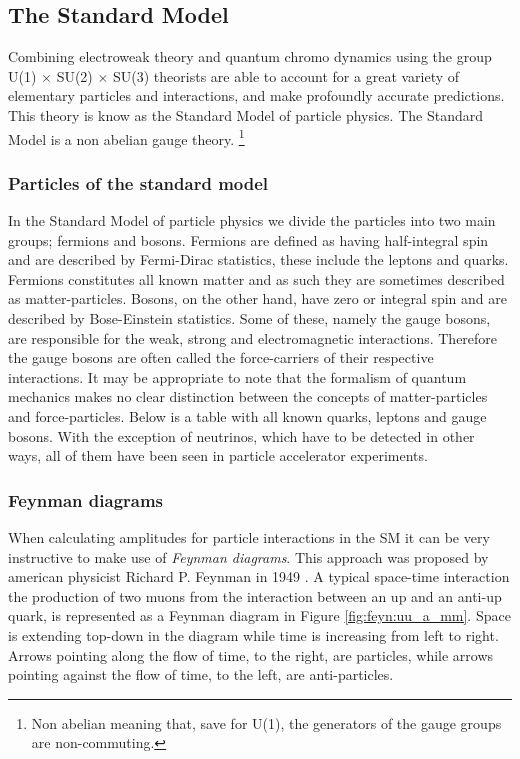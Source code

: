 \subsection{The Standard Model}
Combining electroweak theory and quantum chromo dynamics using the group U(1) $\times$ SU(2) $\times$ SU(3) theorists are able to account for a great variety of elementary particles and interactions, and make profoundly accurate predictions. This theory is know as the Standard Model of particle physics. The Standard Model is a non abelian gauge theory. \footnote{Non abelian meaning that, save for U(1), the generators of the gauge groups are non-commuting.}

\subsubsection{Particles of the standard model}


In the Standard Model of particle physics we divide the particles into two main groups; fermions and bosons. Fermions are defined as having half-integral spin and are described by Fermi-Dirac statistics, these include the leptons and quarks. Fermions constitutes all known matter and as such they are sometimes described as matter-particles. Bosons, on the other hand, have zero or integral spin and are described by Bose-Einstein statistics. Some of these, namely the gauge bosons, are responsible for the weak, strong and electromagnetic interactions. Therefore the gauge bosons are often called the force-carriers of their respective interactions. It may be appropriate to note that the formalism of quantum mechanics makes no clear distinction between the concepts of matter-particles and force-particles. Below is a table with all known quarks, leptons and gauge bosons. With the exception of neutrinos, which have to be detected in other ways, all of them have been seen in particle accelerator experiments.

\subsubsection{Feynman diagrams}
When calculating amplitudes for particle interactions in the SM it can be very instructive to make use of \emph{Feynman diagrams}. This approach was proposed by american physicist Richard P. Feynman in 1949 \cite{feynman1949sta}. A typical space-time interaction the production of two muons from the interaction between an up and an anti-up quark, is represented as a Feynman diagram in Figure \ref{fig:feyn:uu_a_mm}. Space is extending top-down in the diagram while time is increasing from left to right. Arrows pointing along the flow of time, to the right, are particles, while arrows pointing against the flow of time, to the left, are anti-particles.

